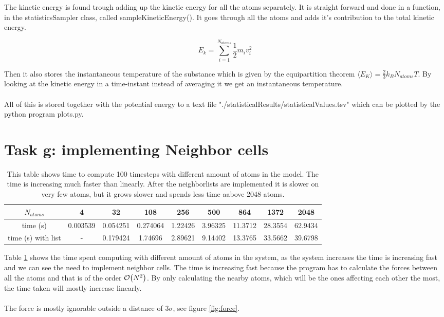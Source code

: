 \documentclass[11pt]{article}
\begin{document}
		The kinetic energy is found trough adding up the kinetic energy for all the atoms separately. It is straight forward and done in a function, in the statisticsSampler class, called sampleKineticEnergy(). It goes through all the atoms and adds it's contribution to the total kinetic energy. 

		\[
		E_k = \sum\limits^{N_{atoms}}_{i=1}{\frac{1}{2}m_i v_i^2}
		\]

		\noindent Then it also stores the instantaneous temperature of the substance which is given by the equipartition theorem \( \langle E_K \rangle = \frac{2}{3} k_B N_{atoms} T \). By looking at the kinetic energy in a time-instant instead of averaging it we get an instantaneous temperature.
\\ \\
		\noindent All of this is stored together with the potential energy to a text file "./statisticalResults/statisticalValues.tsv" which can be plotted by the python program plots.py.

\section{Task g: implementing Neighbor cells}
	\begin{table}
		\begin{tabular}{| c | c | c | c | c | c | c | c | c |}
		\hline
			\(N_{atoms}\)	&	4 			&	32			&	108			&	256		&	500		&	864		& 1372		&	2048
			\\ \hline
			time (s)		&	0.003539	&	0.054251	&	0.274064	&	1.22426	&	3.96325	&	11.3712	& 28.3554	& 62.9434 
			\\ \hline
			time (s) with list & -			& 0.179424		&	1.74696		&	2.89621	&	9.14402	&	13.3765	& 33.5662	& 39.6798
			\\ \hline
		\end{tabular}
	\label{tab:time_spent}
	\caption{This table shows time to compute 100 timesteps with different amount of atoms in the model. The time is increasing much faster than linearly. After the neighborlists are implemented it is slower on very few atoms, but it grows slower and spends less time aabove 2048 atoms.}
	\end{table}

	Table \ref{tab:time_spent} shows the time spent computing with different amount of atoms in the system, as the system increases the time is increasing fast and we can see the need to implement neighbor cells. The time is increasing fast because the program has to calculate the forces between all the atoms and that is of the order \(\order{N^2}\). By only calculating the nearby atoms, which will be the ones affecting each other the most, the time taken will mostly increase linearly.
\\ \\
	\noindent The force is mostly ignorable outside a distance of \(3 \sigma \), see figure \ref{fig:force}.
\end{document}
